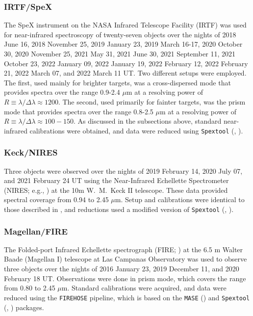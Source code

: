 \documentclass[twocolumn,tighten,twocolappendix]{aastex631}
\begin{document}
\subsubsection{IRTF/SpeX}

The SpeX instrument on the NASA Infrared Telescope Facility (IRTF) was used for near-infrared spectroscopy of twenty-seven objects over the nights of 2018 June 16, 2018 November 25, 2019 January 23, 2019 March 16-17, 2020 October 30, 2020 November 25, 2021 May 31, 2021 June 30, 2021 September 11, 2021 October 23, 2022 January 09, 2022 January 19, 2022 February 12, 2022 February 21, 2022 March 07, and 2022 March 11 UT. Two different setups were employed. The first, used mainly for brighter targets, was a cross-dispersed mode that provides spectra over the range 0.9-2.4 $\mu$m at a resolving power of $R \equiv {\lambda}/{\Delta}{\lambda} \approx 1200$. The second, used primarily for fainter targets, was the prism mode that provides spectra over the range 0.8-2.5 $\mu$m at a resolving power of $R \equiv {\lambda}/{\Delta}{\lambda} \approx 100-150$. As discussed in the subsections above, standard near-infrared calibrations  were obtained, and data were reduced using \texttt{Spextool} (\citealt{cushing2004}, \citealt{vacca2003}).

\subsubsection{Keck/NIRES}

Three objects were observed over the nights of 2019 February 14, 2020 July 07, and 2021 February 24 UT using the Near-Infrared Echellette Spectrometer (NIRES; e.g., \citealt{wilson2004}) at the 10m W.\ M.\ Keck II telescope. These data provided spectral coverage from 0.94 to 2.45 $\mu$m. Setup and calibrations were identical to those described in \cite{meisner2020b}, and reductions used a modified version of \texttt{Spextool} (\citealt{cushing2004}, \citealt{vacca2003}).

\subsubsection{Magellan/FIRE}

The Folded-port Infrared Echellette spectrograph (FIRE; \citealt{simcoe2013}) at the 6.5 m Walter Baade (Magellan I) telescope at Las Campanas Observatory was used to observe three objects over the nights of 2016 January 23, 2019 December 11, and 2020 February 18 UT. Observations were done in prism mode, which covers the range from 0.80 to 2.45 $\mu$m. Standard calibrations were acquired, and data were reduced using the \texttt{FIREHOSE} pipeline, which is based on the \texttt{MASE} (\citealt{bochanski2009}) and \texttt{Spextool} (\citealt{cushing2004}, \citealt{vacca2003}) packages.
\end{document}
